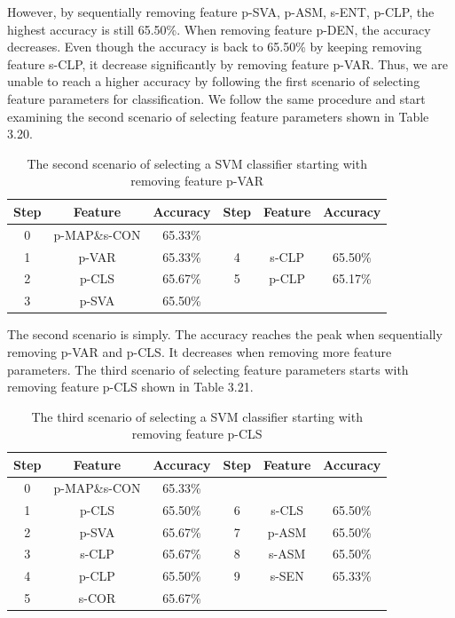 However, by sequentially removing feature p-SVA, p-ASM, s-ENT, p-CLP, the highest accuracy is still 65.50\%. When removing feature p-DEN, the accuracy decreases. Even though the accuracy is back to 65.50\% by keeping removing feature s-CLP, it decrease significantly by removing feature p-VAR. Thus, we are unable to reach a higher accuracy by following the first scenario of selecting feature parameters for classification. 
We follow the same procedure and start examining the second scenario of selecting feature parameters shown in Table 3.20.
\begin{table}[!h]
\begin{center}
\renewcommand{\arraystretch}{0.5}
\begin{tabular}{|| c | c | c | c | c | c ||}
\hline
 Step & Feature & Accuracy & Step & Feature & Accuracy \\
\hline
 0 & p-MAP\;\&\;s-CON & 65.33\% & & & \\
\hline
 1 & p-VAR & 65.33\% & 4 & s-CLP & 65.50\% \\
 2 & p-CLS & 65.67\% & 5 & p-CLP & 65.17\% \\
 3 & p-SVA & 65.50\% &  &  & \\
\hline
\end{tabular}
\end{center}
\caption{The second scenario of selecting a SVM classifier starting with removing feature p-VAR}
\end{table}
The second scenario is simply. The accuracy reaches the peak when sequentially removing p-VAR and p-CLS. It decreases when removing more feature parameters. The third scenario of selecting feature parameters starts with removing feature p-CLS shown in Table 3.21. 
\begin{table}[!h]
\begin{center}
\renewcommand{\arraystretch}{0.5}
\begin{tabular}{|| c | c | c | c | c | c ||}
\hline
 Step & Feature & Accuracy & Step & Feature & Accuracy \\
\hline
 0 & p-MAP\;\&\;s-CON & 65.33\% & & & \\
\hline
 1 & p-CLS & 65.50\% & 6 & s-CLS & 65.50\% \\
 2 & p-SVA & 65.67\% & 7 & p-ASM & 65.50\% \\
 3 & s-CLP & 65.67\% & 8 & s-ASM & 65.50\% \\
 4 & p-CLP & 65.50\% & 9 & s-SEN & 65.33\% \\
 5 & s-COR & 65.67\% & & &  \\
\hline
\end{tabular}
\end{center}
\caption{The third scenario of selecting a SVM classifier starting with removing feature p-CLS}
\end{table}
